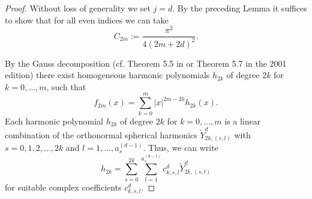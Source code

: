 \documentclass[10pt,a4paper]{amsart}
\begin{document}
\begin{proof} Without loss of generality we set $j = d$.
  By the preceding Lemma it suffices
to show that for all even indices we can take
$$C_{2m} := \frac{\pi^{2}}{4\left( 2m+ 2 d\right) ^{2}}.
$$


 By the Gauss
decomposition (cf. Theorem 5.5 in \cite{ABR92} or Theorem 5.7 in the 2001 edition) there exist homogeneous
harmonic polynomials $h_{2k}$ of degree $2k$ for $k=0,\dots ,m$, such that 
\begin{equation}
f_{2m} (x) =\sum_{k=0}^{m}  \left\vert x\right\vert ^{2m-2k} h_{2k}(x)\text{.}
\label{eqAlmansi1}
\end{equation}
 Each harmonic polynomial $h_{2k}$
of degree $2k$ for $k=0,\dots ,m$ is a linear combination of the orthonormal
spherical harmonics $\widetilde{Y}_{2k,\left( s,l\right) }^{d}$ with $
s=0,1,2,\dots ,2k$ and $l=1,\dots ,a_{s}^{(d-1)}$. Thus, we can write 
\begin{equation*}
h_{2k}=\sum_{s=0}^{2k}\sum_{l=1}^{a_{s}^{\left( d-1\right) }}c_{k,s,l}^{d}
\widetilde{Y}_{2k,\left( s,l\right) }^{d}
\end{equation*}
for suitable complex coefficients $c_{k,s,l}^{d}.$ \color{red} \color{black}


\end{proof}
\end{document}
